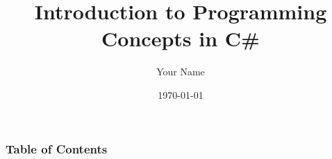 \documentclass{beamer}
\title{Introduction to Programming Concepts in C\#}
\author{Your Name}
\date{\today}
\begin{document}
\frame{\titlepage}

\begin{frame}
\frametitle{Table of Contents}
\tableofcontents
\end{frame}





\end{document}
